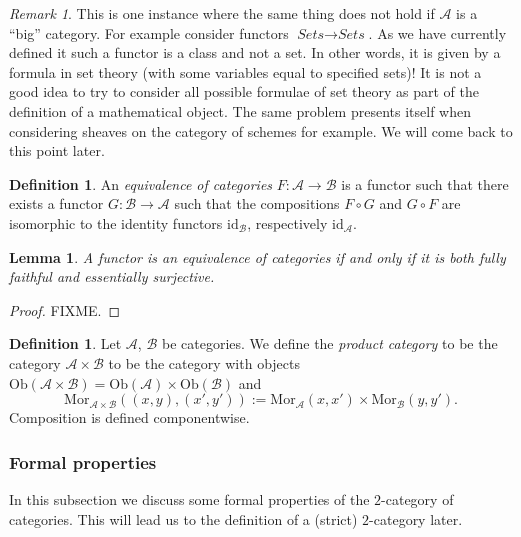 \documentclass{amsart}
\newtheorem{lemma}[theorem]{Lemma}
\theoremstyle{definition}
\newtheorem{definition}[theorem]{Definition}
\theoremstyle{remark}
\newtheorem{remark}[theorem]{Remark}
\numberwithin{equation}{subsection}
\begin{document}
\begin{remark}
This is one instance where the same thing does not hold if
$\mathcal{A}$ is a ``big'' category. For example consider
functors $\textit{Sets} \to \textit{Sets}$. As we have currently
defined it such a functor is a class and not a set. In other
words, it is given by a formula in set theory (with some variables
equal to specified sets)! It is not a good idea to try to consider
all possible formulae of set theory as part of the definition of 
a mathematical object. The same problem presents itself when
considering sheaves on the category of schemes for example.
We will come back to this point later.
\end{remark}

\begin{definition}
\label{definiton-equivalence-categories}
An {\it equivalence of categories}
$F : \mathcal{A} \to \mathcal{B}$ is a functor such that there
exists a functor $G : \mathcal{B} \to \mathcal{A}$ such that
the compositions $F \circ G$ and $G \circ F$ are isomorphic to the
identity functors $\text{id}_\mathcal{B}$,
respectively $\text{id}_\mathcal{A}$.
\end{definition}

\begin{lemma}
A functor is an equivalence of categories if and only if it is both fully
faithful and essentially surjective.
\end{lemma}

\begin{proof} FIXME. \end{proof}

\begin{definition}
\label{definition-product-category}
Let $\mathcal{A}$, $\mathcal{B}$ be categories.
We define the {\it product category} to be the category
$\mathcal{A}\times \mathcal{B}$ to be the category with
objects
$\text{Ob}(\mathcal{A}\times \mathcal{B}) =
\text{Ob}(\mathcal{A}) \times \text{Ob}(\mathcal{B})$
and 
$$
\text{Mor}_{\mathcal{A}\times \mathcal{B}}((x,y), (x',y'))
:=
\text{Mor}_{\mathcal{A}}(x, x')\times
\text{Mor}_{\mathcal{B}}(y, y').
$$
Composition is defined componentwise.
\end{definition}

\subsubsection{Formal properties}
\label{subsubsection-formal-cat-cat}

\noindent
In this subsection we discuss some formal properties of the
$2$-category of categories. This will lead us to the definition
of a (strict) $2$-category later.
\end{document}
